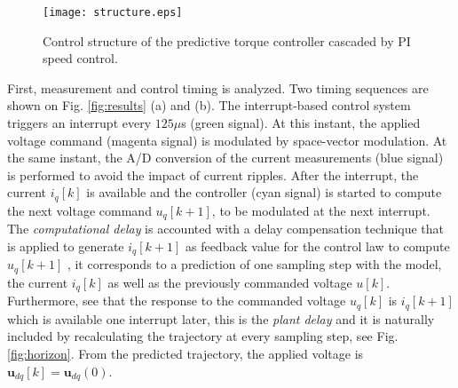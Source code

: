 \documentclass[a4paper,11pt,fleqn]{article}
\begin{document}



\begin{figure}[!ht]
  \centering
  \texttt{[image: structure.eps]}
  \caption{Control structure of the predictive torque controller cascaded by PI speed control.\label{fig:structure}}
\end{figure}





First, measurement and control timing is analyzed. Two timing sequences are shown on Fig. \ref{fig:results} (a) and (b). The interrupt-based control system triggers an interrupt every $125\mu$s (green signal). At this instant, the applied voltage command (magenta signal) is modulated by space-vector modulation. At the same instant, the A/D conversion of the current measurements (blue signal) is performed to avoid the impact of current ripples. After the interrupt, the current $i_q[k]$ is available and the controller (cyan signal) is started to compute the next voltage command $u_q[k+1]$, to be modulated at the next interrupt. The \textit{computational delay} is accounted with a delay compensation technique that is applied to generate $i_q[k+1]$ as feedback value for the control law to compute $u_q[k+1]$ \cite{Moon}, it corresponds to a prediction of one sampling step with the model, the current $i_q[k]$ as well as the previously commanded voltage $u[k]$. Furthermore, see that the response to the commanded voltage $u_q[k]$ is $i_q[k+1]$ which is available one interrupt later, this is the \textit{plant delay} and it is naturally included by recalculating the trajectory at every sampling step, see Fig. \ref{fig:horizon}. From the predicted trajectory, the applied voltage is $\bm{u}_{dq}[k] = \bm{u}_{dq}(0)$.
\end{document}
